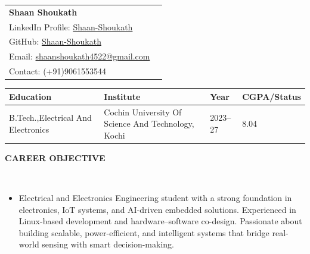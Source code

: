 \documentclass[10pt,a4paper]{article}
\newcommand{\resheading}[1]{{\small \colorbox{mygrey}{\begin{minipage}{0.99\textwidth}{\textbf{#1 \vphantom{p\^{E}}}}\end{minipage}}}}
\begin{document}

\begin{table}
    \begin{minipage}{0.15\linewidth}
        \centering
    \end{minipage}
    \begin{minipage}{1.65\linewidth}
        \setlength{\tabcolsep}{20pt}
        \def\arraystretch{1.15}
        \begin{tabular}{ll}
            \textbf{\Large{Shaan Shoukath}}   \\
            LinkedIn Profile: 
            \href{https://www.linkedin.com/in/shaan-shoukath-04a9b12b2/}
            {Shaan-Shoukath}\\
            GitHub:
            \href{https://github.com/Shaan-Shoukath}
            {Shaan-Shoukath}\\
            Email: 
            \href{mailto:shaanshoukath4522@gmail.com} {shaanshoukath4522@gmail.com}  \\
            Contact: {(+91)9061553544} \\
        \end{tabular}
    \end{minipage}\hfill
\end{table}    

\setlength{\tabcolsep}{5pt}

\begin{table}
\centering
\begin{tabular}{llll}
\toprule
\textbf{Education} & \textbf{Institute} & \textbf{Year} & \textbf{CGPA/Status} \\ 
\toprule
B.Tech.,Electrical And Electronics & Cochin University Of Science And Technology, Kochi & 2023–27 & 8.04 \\
\bottomrule
\end{tabular}
\end{table}


\noindent
\resheading{\textbf{CAREER OBJECTIVE}}\\[-0.4cm]
\begin{itemize}
\item Electrical and Electronics Engineering student with a strong foundation in electronics, IoT systems, and AI-driven embedded solutions. Experienced in Linux-based development and hardware–software co-design. Passionate about building scalable, power-efficient, and intelligent systems that bridge real-world sensing with smart decision-making.
\end{itemize}
\end{document}
